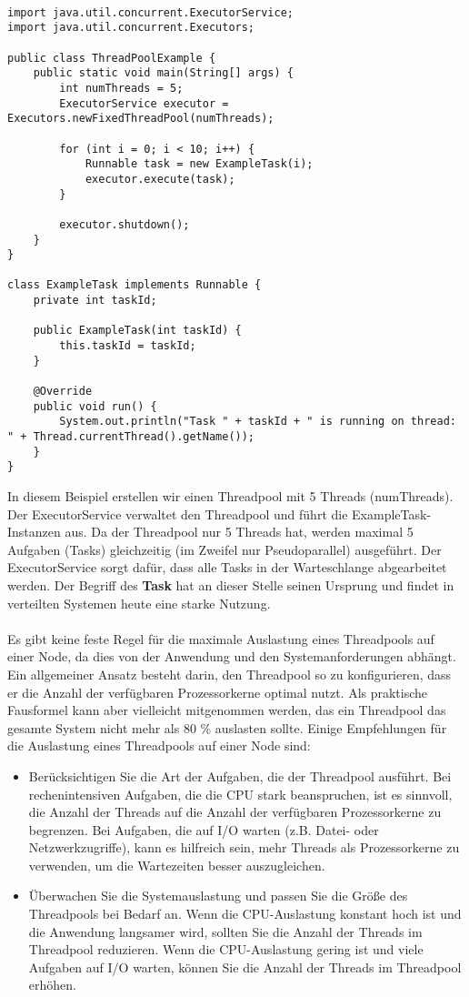 \begin{lstlisting}[caption={ExecutorService-Klasse},captionpos=b,label={lst:executor}]

import java.util.concurrent.ExecutorService;
import java.util.concurrent.Executors;

public class ThreadPoolExample {
    public static void main(String[] args) {
        int numThreads = 5;
        ExecutorService executor = Executors.newFixedThreadPool(numThreads);

        for (int i = 0; i < 10; i++) {
            Runnable task = new ExampleTask(i);
            executor.execute(task);
        }

        executor.shutdown();
    }
}

class ExampleTask implements Runnable {
    private int taskId;

    public ExampleTask(int taskId) {
        this.taskId = taskId;
    }

    @Override
    public void run() {
        System.out.println("Task " + taskId + " is running on thread: " + Thread.currentThread().getName());
    }
}
\end{lstlisting}
In diesem Beispiel erstellen wir einen Threadpool mit 5 Threads (numThreads). Der ExecutorService verwaltet den Threadpool und führt die ExampleTask-Instanzen aus. Da der Threadpool nur 5 Threads hat, werden maximal 5 Aufgaben (Tasks) gleichzeitig (im Zweifel nur Pseudoparallel) ausgeführt. Der ExecutorService sorgt dafür, dass alle Tasks in der Warteschlange abgearbeitet werden. Der Begriff des \textbf{Task} hat an dieser Stelle seinen Ursprung und findet in verteilten Systemen heute eine starke Nutzung.\\\\


Es gibt keine feste Regel für die maximale Auslastung eines Threadpools auf einer Node, da dies von der Anwendung und den Systemanforderungen abhängt. Ein allgemeiner Ansatz besteht darin, den Threadpool so zu konfigurieren, dass er die Anzahl der verfügbaren Prozessorkerne optimal nutzt. Als praktische Fausformel kann aber vielleicht mitgenommen werden, das ein Threadpool das gesamte System nicht mehr als 80 \% auslasten sollte.
Einige Empfehlungen für die Auslastung eines Threadpools auf einer Node sind:
\begin{itemize}
\item Berücksichtigen Sie die Art der Aufgaben, die der Threadpool ausführt. Bei rechenintensiven Aufgaben, die die CPU stark beanspruchen, ist es sinnvoll, die Anzahl der Threads auf die Anzahl der verfügbaren Prozessorkerne zu begrenzen. Bei Aufgaben, die auf I/O warten (z.B. Datei- oder Netzwerkzugriffe), kann es hilfreich sein, mehr Threads als Prozessorkerne zu verwenden, um die Wartezeiten besser auszugleichen.
\item Überwachen Sie die Systemauslastung und passen Sie die Größe des Threadpools bei Bedarf an. Wenn die CPU-Auslastung konstant hoch ist und die Anwendung langsamer wird, sollten Sie die Anzahl der Threads im Threadpool reduzieren. Wenn die CPU-Auslastung gering ist und viele Aufgaben auf I/O warten, können Sie die Anzahl der Threads im Threadpool erhöhen.
\end{itemize}
